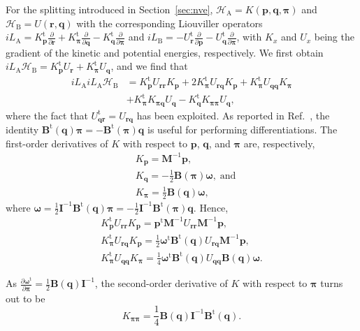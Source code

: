 \documentclass[
journal=jctcce,
layout=twocolumn
]{achemso}
\newcommand{\mt}[1]{\boldsymbol{\mathbf{#1}}}   %
\newcommand{\vt}[1]{\boldsymbol{\mathbf{#1}}}   %
\newcommand{\tr}[1]{#1^\text{t}}                %
\newcommand{\diff}[2]{\frac{\partial #1}{\partial #2}} %
\newcommand{\Ham}[1]{{\mathcal H}_\text{#1}}    %
\newcommand{\Liu}[1]{i\!L_\text{#1}}            %
\begin{document}
For the splitting introduced in Section~\ref{sec:nve}, $\Ham A = K(\vt p, \vt q, \vt \pi)$ and $\Ham B = U(\vt r, \vt q)$ with the corresponding Liouviller operators $\Liu{A} = \tr{K_{\vt p}}\diff{}{\vt r} + \tr{K_{\vt \pi}}\diff{}{\vt q} - \tr{K_{\vt q}}\diff{}{\vt \pi}$ and $\Liu{B} = -\tr{U_{\vt r}}\diff{}{\vt p} - \tr{U_{\vt q}}\diff{}{\vt \pi}$, with $K_{x}$ and $U_{x}$ being the gradient of the kinetic and potential energies, respectively.
We first obtain $\Liu A \Ham B = \tr{K_{\vt p}} U_{\vt r} + \tr{K_{\vt \pi}} U_{\vt q}$, and we find that
\begin{align*}
\Liu A \Liu A \Ham B &= \tr{K_{\vt p}} U_{\vt r \vt r} K_{\vt p}
+ 2 \tr{K_{\vt \pi}} U_{\vt r \vt q} K_{\vt p}
+ \tr{K_{\vt \pi}} U_{\vt q \vt q} K_{\vt \pi} \\
&+ \tr{K_{\vt \pi}} K_{\vt \pi \vt q} U_{\vt q}
- \tr{K_{\vt q}} K_{\vt \pi \vt \pi} U_{\vt q},
\end{align*}
where the fact that $\tr{U_{\vt q \vt r}} = U_{\vt r \vt q}$ has been exploited.
As reported in Ref.~, the identity $\tr{\mt B}(\vt q) {\vt \pi} = -\tr{\mt B}(\vt \pi) {\vt q}$ is useful for performing differentiations.
The first-order derivatives of $K$ with respect to $\vt p$, $\vt q$, and $\vt \pi$ are, respectively,
\begin{align*}
&K_{\vt p} = {\mt M}^{-1} {\vt p}, \\
&K_{\vt q} = -\frac{1}{2} {\mt B}(\vt \pi) {\vt \omega}, \; \text{and} \\
&K_{\vt \pi} = \frac{1}{2} {\mt B}(\vt q) {\vt \omega},
\end{align*}
where $\vt \omega = \frac{1}{2} {\mt I}^{-1} \tr{\mt B}(\vt q) \vt \pi = -\frac{1}{2} {\mt I}^{-1} \tr{\mt B}(\vt \pi) \vt q$.\cite{Silveira_2017} Hence,
\begin{gather*}
\tr{K_{\vt p}} U_{\vt r \vt r} K_{\vt p} = \tr{\vt p} {\mt M}^{-1} U_{\vt r \vt r} {\mt M}^{-1} {\vt p}, \\
\tr{K_{\vt \pi}} U_{\vt r \vt q} K_{\vt p} = \frac{1}{2} \tr{\vt \omega} \tr{\mt B}(\vt q) U_{\vt r \vt q} {\mt M}^{-1} {\vt p}, \\
\tr{K_{\vt \pi}} U_{\vt q \vt q} K_{\vt \pi} = \frac{1}{4} \tr{\vt \omega} \tr{\mt B}(\vt q) U_{\vt q \vt q} {\mt B}(\vt q) \vt \omega.
\end{gather*}

As $\diff{\tr{\vt \omega}}{\vt \pi} = \frac{1}{2} {\mt B}(\vt q) {\mt I}^{-1}$, the second-order derivative of $K$ with respect to $\vt \pi$ turns out to be
\begin{equation*}
K_{\vt \pi \vt \pi} = \frac{1}{4} {\mt B}(\vt q) {\mt I}^{-1} \tr{\mt B}(\vt q).
\end{equation*}
\end{document}
